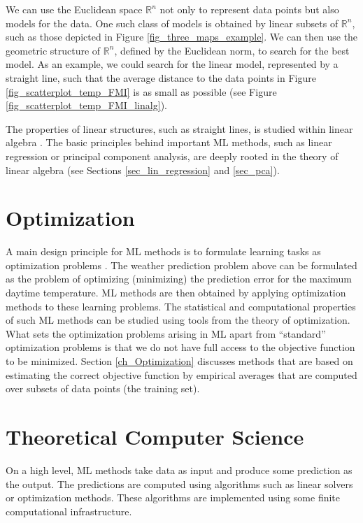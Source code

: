 \documentclass[12pt]{report}
\begin{document}
We can use the Euclidean space $\mathbb{R}^{n}$ not only to represent 
data points but also models for the data. One such class of models is 
obtained by linear subsets of $\mathbb{R}^{n}$, such as those depicted 
in Figure \ref{fig_three_maps_example}. We can then use the geometric 
structure of $\mathbb{R}^{n}$, defined by the Euclidean norm, to search 
for the best model. As an example, we could search for the linear model, 
represented by a straight line, such that the average distance to the data 
points in Figure \ref{fig_scatterplot_temp_FMI} is as small as possible 
(see Figure \ref{fig_scatterplot_temp_FMI_linalg}). 

The properties of linear structures, such as straight lines, is 
studied within linear algebra \cite{StrangLinAlg2016}. The basic 
principles behind important ML methods, such as linear regression 
or principal component analysis, are deeply rooted in the theory 
of linear algebra (see Sections \ref{sec_lin_regression} and \ref{sec_pca}).

\newpage
\section{Optimization} 

A main design principle for ML methods is to formulate learning tasks as  
optimization problems \cite{OptMLBook}. The weather prediction problem 
above can be formulated as the problem of optimizing (minimizing) the 
prediction error for the maximum daytime temperature.  ML methods are 
then obtained by applying optimization methods to these learning problems. 
The statistical and computational properties of such ML methods can be 
studied using tools from the theory of optimization. What sets the optimization 
problems arising in ML apart from ``standard'' optimization problems is that 
we do not have full access to the objective function to be minimized. 
Section \ref{ch_Optimization} discusses methods that are based on estimating 
the correct objective function by empirical averages that 
are computed over subsets of data points (the training set). 

\section{Theoretical Computer Science} 

On a high level, ML methods take data as input and produce 
some prediction as the output. The predictions are computed 
using algorithms such as linear solvers or optimization methods. 
These algorithms are implemented using some finite computational 
infrastructure. 
\end{document}
